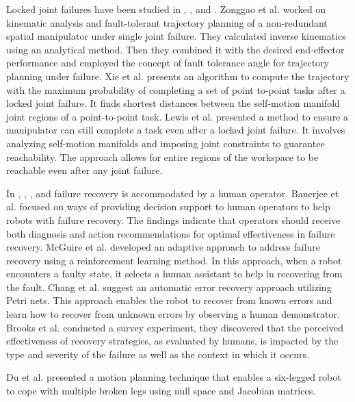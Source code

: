 
Locked joint failures have been studied in  \cite{mu2016kinematic}, \cite{xie2021maximizing}, and \cite{lewis1997fault}. Zonggao et al. \cite{mu2016kinematic} worked on kinematic analysis and fault-tolerant trajectory planning of a non-redundant spatial manipulator under single joint failure. They calculated inverse kinematics using an analytical method. Then they combined it with the desired end-effector performance and employed the concept of fault tolerance angle for trajectory planning under failure. Xie et al. \cite{xie2021maximizing} presents an algorithm to compute the trajectory with the maximum probability of completing a set of point to-point tasks after a locked joint failure. It finds shortest distances between the self-motion manifold joint regions of a point-to-point task. Lewis et al. \cite{lewis1997fault} presented a method to ensure a manipulator can still complete a task even after a locked joint failure. It involves analyzing self-motion manifolds and imposing joint constraints to guarantee reachability. The approach allows for entire regions of the workspace to be reachable even after any joint failure. 

In \cite{banerjee2020tale}, \cite{mcguire2019everybody}, \cite{chang2013robot}, and \cite{brooks2016analysis} failure recovery is accommodated by a human operator. Banerjee et al. \cite{banerjee2020tale} focused on ways of providing decision support to human operators to help robots with failure recovery. The findings indicate that operators should receive both diagnosis and action recommendations for optimal effectiveness in failure recovery. McGuire et al. \cite{mcguire2019everybody} developed an adaptive approach to address failure recovery using a reinforcement learning method. In this approach, when a robot encounters a faulty state, it selects a human assistant to help in recovering from the fault. Chang et al. \cite{chang2013robot} suggest an automatic error recovery approach utilizing Petri nets. This approach enables the robot to recover from known errors and learn how to recover from unknown errors by observing a human demonstrator. Brooks et al. \cite{brooks2016analysis} conducted a survey experiment, they discovered that the perceived effectiveness of recovery strategies, as evaluated by humans, is impacted by the type and severity of the failure as well as the context in which it occurs. 

Du et al. \cite{du2017fault} presented a motion planning technique that enables a six-legged robot to cope with multiple broken legs using null space and Jacobian matrices.

